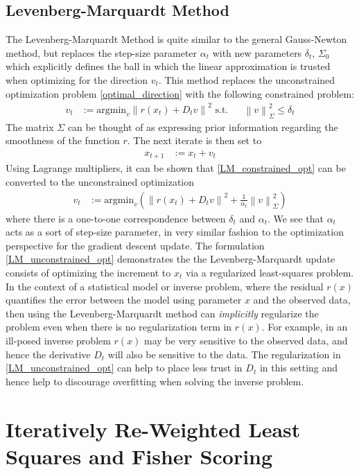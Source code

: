 \documentclass[12pt]{article}
\newcommand*{\norm}[1]{\left\lVert#1\right\rVert}
\begin{document}
\subsection{Levenberg-Marquardt Method}
The Levenberg-Marquardt Method is quite similar to the general Gauss-Newton method, but replaces the step-size parameter $\alpha_t$ with new parameters $\delta_t$, $\Sigma_0$ which explicitly defines 
the ball in which the linear approximation is trusted when optimizing for the direction $v_t$. This method replaces the unconstrained optimization problem \ref{optimal_direction} with the following 
constrained problem:
\begin{align}
v_t &:= \text{argmin}_v \norm{r(x_t) + D_t v}^2 \text{   s.t.} && \norm{v}^2_{\Sigma} \leq \delta_t \label{LM_constrained_opt}
\end{align}
The matrix $\Sigma$ can be thought of as expressing prior information regarding the smoothness of the function $r$. The next iterate is then set to 
\begin{align*}
x_{t+1} &:= x_t + v_t
\end{align*}
Using Lagrange multipliers, it can be shown that \ref{LM_constrained_opt} can be converted to the unconstrained optimization 
\begin{align}
v_t &:= \text{argmin}_v\left( \norm{r(x_t) + D_t v}^2 + \frac{1}{\alpha_t} \norm{v}^2_{\Sigma}\right) \label{LM_unconstrained_opt}
\end{align}
where there is a one-to-one correspondence between $\delta_t$ and $\alpha_t$. We see that $\alpha_t$ acts as a sort of step-size parameter, in very similar fashion to the optimization perspective 
for the gradient descent update. The formulation \ref{LM_unconstrained_opt} demonstrates the the Levenberg-Marquardt update consists of optimizing the increment to $x_t$ via a regularized 
least-squares problem. In the context of a statistical model or inverse problem, where the residual $r(x)$ quantifies the error between the model using parameter $x$ and the observed data, then 
using the Levenberg-Marquardt method can \textit{implicitly} regularize the problem even when there is no regularization term in $r(x)$. For example, in an ill-posed inverse problem $r(x)$ may be very 
sensitive to the observed data, and hence the derivative $D_t$ will also be sensitive to the data. The regularization in \ref{LM_unconstrained_opt} can help to place less trust in $D_t$ in this setting and hence 
help to discourage overfitting when solving the inverse problem.  


\section{Iteratively Re-Weighted Least Squares and Fisher Scoring}
\end{document}
